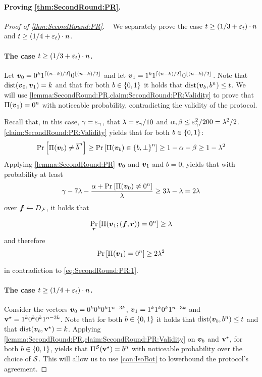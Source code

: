 \paragraph{Proving \cref{thm:SecondRound:PR}.}
\begin{proof}[Proof of \cref{thm:SecondRound:PR}]~
We separately prove the case $t \ge (1/3 + \varepsilon_t)\cdot n$ and $t \ge (1/4 + \varepsilon_t)\cdot n$.

\paragraph{The case $t \ge (1/3 + \varepsilon_t)\cdot n$.}
Let ${ \boldsymbol{v}}_0= 0^k 1^{\left\lceil (n-k)/2 \right\rceil} 0^{\left \lfloor(n-k)/2 \right \rfloor} $ and let ${ \boldsymbol{v}}_1= 1^k 1^{\left\lceil (n-k)/2 \right\rceil} 0^{\left \lfloor(n-k)/2 \right \rfloor} $. Note that $\mathrm{dist}({ \boldsymbol{v}}_0,{ \boldsymbol{v}}_1)=k$ and that for both $b\in \{0,1\}$ it holds that $\mathrm{dist}({ \boldsymbol{v}}_b,b^n) \le t$. We will use \cref{lemma:SecondRound:PR,claim:SecondRound:PR:Validity} to prove that $\Pi({ \boldsymbol{v}}_1) = 0^n$ with noticeable probability, contradicting the validity of the protocol.

Recall that, in this case, $\gamma = \varepsilon_\gamma$, that $\lambda = \varepsilon_\gamma/10$ and $\alpha,\beta \le \varepsilon_\gamma^2/200 = \lambda^2/2$.  \cref{claim:SecondRound:PR:Validity} yields that for both $b\in\{0,1\}$:
\begin{align}\label{eq:SecondRound:PR:1}
\Pr_{}\left[\Pi({ \boldsymbol{v}}_b) \ne \overline{b}^n \right]\ge \Pr_{}\left[\Pi({ \boldsymbol{v}}_b) \in \left\{b,\perp\right\}^n\right] \ge 1- \alpha - \beta \ge 1- \lambda^2
\end{align}
Applying \cref{lemma:SecondRound:PR} \wrt ${ \boldsymbol{v}}_0$ and ${ \boldsymbol{v}}_1$ and $b=0$, yields that with probability at least
\[
\gamma- 7\lambda- \frac{\alpha + \Pr_{}\left[\Pi({ \boldsymbol{v}}_0) \ne 0^n\right]}{\lambda} \geq 3\lambda- \lambda=2 \lambda
\]
over ${ \boldsymbol{f}} \gets D_{\cal F}$, it holds that

\begin{align*}
\Pr_{{ \boldsymbol{r}}}\left[\Pi({ \boldsymbol{v}}_1;({ \boldsymbol{f}},{ \boldsymbol{r}})) = 0^n\right]\ge \lambda
\end{align*}
and therefore
\begin{align*}
\Pr_{}\left[\Pi({ \boldsymbol{v}}_1) = 0^n\right]\ge 2 \lambda^2
\end{align*}
in contradiction to \cref{eq:SecondRound:PR:1}.



\paragraph{The case $t \ge (1/4 + \varepsilon_t)\cdot n$.} Consider the vectors ${ \boldsymbol{v}}_0= 0^k 0^k 0^k 1^{n-3k}$, ${ \boldsymbol{v}}_1= 1^k 1^k 0^k 1^{n-3k}$ and $\mathbf{v}^{\star} =1^k 0^k 0^k 1^{n-3k}$. Note that for both $b\in \{0,1\}$ it holds that $\mathrm{dist}({ \boldsymbol{v}}_b,b^n) \le t$ and that $\mathrm{dist}({ \boldsymbol{v}}_b,\mathbf{v}^{\star})=k$. Applying \cref{lemma:SecondRound:PR,claim:SecondRound:PR:Validity} on ${ \boldsymbol{v}}_b$ and $\mathbf{v}^{\star}$, for both $b\in \{0,1\}$, yields that $\Pi^{\cal{S}}(\mathbf{v}^{\star}) = b^n$ with noticeable probability over the choice of ${\cal{S}}$. This will allow us to use \cref{con:IsoBot} to lowerbound the protocol's agreement.


\end{proof}
